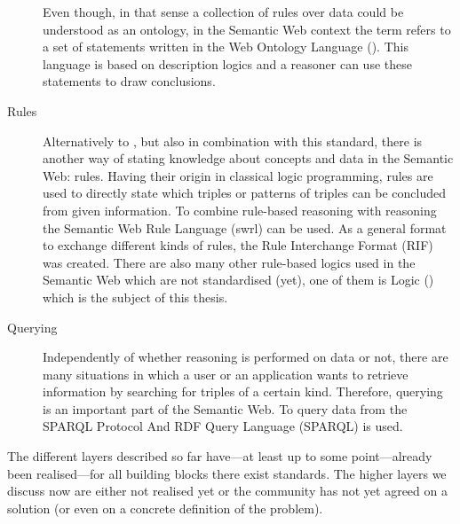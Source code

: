 \begin{description}
 Even though, in that sense a collection of rules over \rdf data could be understood as an ontology,  in the Semantic Web context the term refers to a set of statements written in the Web 
 Ontology Language (\owl). This language is based on description logics and a reasoner can use these statements to draw conclusions.
 \item[Rules] Alternatively to \owl, but also in combination with this standard, there is another way of stating knowledge about concepts and data in the Semantic Web: rules. 
 Having their origin in classical logic programming, rules are used to directly state which triples or patterns of triples can be concluded from given information. To combine rule-based reasoning 
 with \owl reasoning the Semantic Web Rule Language (swrl) can be used. As a general format to exchange different kinds of rules, the Rule Interchange Format (RIF) was created. 
 There are also many other 
 rule-based logics used in the Semantic Web which are not standardised (yet), one of them is \notationthree Logic (\nthreelogic) 
 which is the subject of this thesis.
 \item[Querying] Independently of whether reasoning is performed on \rdf data or not, there are many situations in which a user or an application wants to retrieve information 
 by searching for triples of a certain kind. Therefore, querying is an important part of the Semantic Web. To query data from \rdf the SPARQL Protocol And RDF Query Language (SPARQL) is used.
 \end{description}
 The different layers described so far have---at least up to some point---already been realised---for all building blocks there exist standards. 
 The higher layers we discuss now
are either not realised yet or the community has not yet agreed on a solution (or even on a concrete definition of the problem). 
